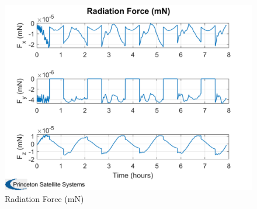 \begin{itemize}
\begin{figure}[H]
\begin{minipage}{0.48\linewidth}
        \includegraphics[width=0.95\linewidth]{res/img/Nadir_no_EKF/Radiation Force (mN).png}
        \caption{Radiation Force (mN)}
        \label{fig:RadiationForce}
    \end{minipage}
\end{figure}


\end{itemize}
